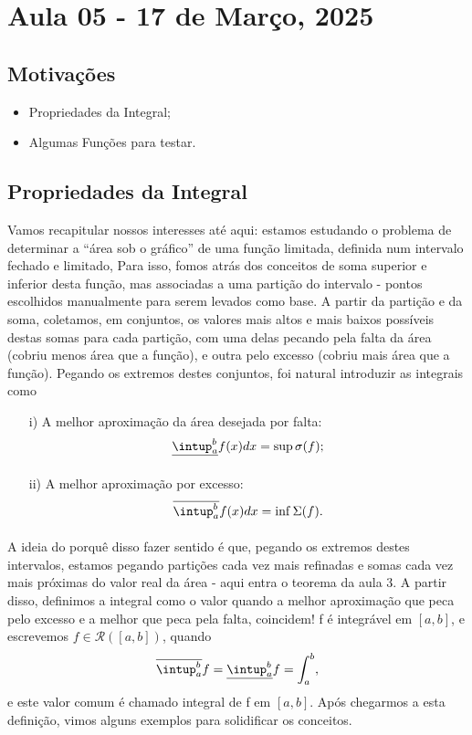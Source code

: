 \documentclass[../analysisII_notes.tex]{subfiles}
\begin{document}
\section{Aula 05 - 17 de Março, 2025}
\subsection{Motivações}
\begin{itemize}
	\item Propriedades da Integral;
	\item Algumas Funções para testar.
\end{itemize}
\subsection{Propriedades da Integral}
Vamos recapitular nossos interesses até aqui: estamos estudando o problema de determinar a ``área sob o gráfico'' de uma função limitada, definida num intervalo fechado e limitado, Para isso,
fomos atrás dos conceitos de soma superior e inferior desta função, mas associadas a uma partição do intervalo - pontos escolhidos manualmente para serem levados como base. A partir da partição e da soma, coletamos, em conjuntos,
os valores mais altos e mais baixos possíveis destas somas para cada partição, com uma delas pecando pela falta da área (cobriu menos área que a função), e outra pelo excesso (cobriu mais área que a função). Pegando os extremos destes conjuntos, foi natural
introduzir as integrais como
\begin{itemize}
	\item[i)] A melhor aproximação da área desejada por falta:
	      \[
		      \underline{\intup_{a}^{b}}f(x)dx = \sup_{}\sigma (f);
	      \]
	\item[ii)] A melhor aproximação por excesso:
	      \[
		      \overline{\intup_{a}^{b}}f(x)dx=\inf_{}\Sigma (f).
	      \]
\end{itemize}
A ideia do porquê disso fazer sentido é que, pegando os extremos destes intervalos, estamos pegando partições cada vez mais refinadas e somas cada vez mais próximas do valor real da área - aqui entra o teorema da aula 3. A partir disso,
definimos a integral como o valor quando a melhor aproximação que peca pelo excesso e a melhor que peca pela falta, coincidem! f é integrável em \([a, b]\), e escrevemos \(f\in \mathcal{R}([a, b])\), quando
\[
	\overline{\intup_{a}^{b}}f = \underline{\intup_{a}^{b}} f = \int_{a}^{b},
\]
e este valor comum é chamado integral de f em \([a, b]\). Após chegarmos a esta definição, vimos alguns exemplos para solidificar os conceitos.
\end{document}
